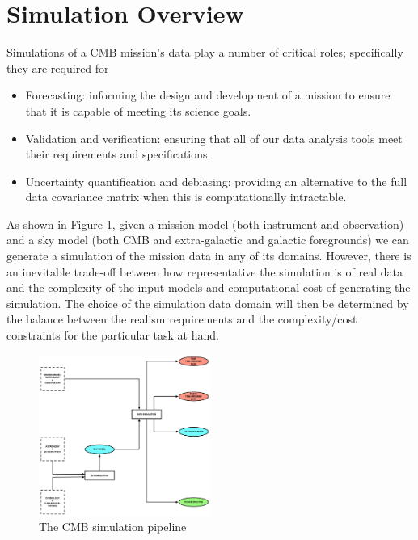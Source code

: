 \newpage



\newpage



\newpage



\newpage

\section{Simulation Overview}
Simulations of a CMB mission's data play a number of critical roles; specifically they are required for
\begin{itemize}
\item Forecasting: informing the design and development of a mission to ensure that it is capable of meeting its science goals.
\item Validation and verification: ensuring that all of our data analysis tools meet their requirements and specifications.
\item Uncertainty quantification and debiasing: providing an alternative to the full data covariance matrix when this is computationally intractable.
\end{itemize}

As shown in Figure \ref{fig_sim}, given a mission model (both instrument and observation) and a sky model (both CMB and extra-galactic and galactic foregrounds) we can generate a simulation of the mission data in any of its domains. However, there is an inevitable trade-off between how representative the simulation is of real data and the complexity of the input models and computational cost of generating the simulation. The choice of the simulation data domain will then be determined by the balance between the realism requirements and the complexity/cost constraints for the particular task at hand.

\begin{figure}[htbp]
\centering
\includegraphics[width=0.5\textwidth]{Analysis/sim}
\caption{The CMB simulation pipeline}
\label{fig_sim}
\end{figure}

